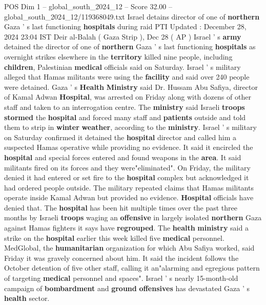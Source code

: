 \begin{textsample}{POS Dim 1 – global\_south\_2024\_12 – Score 32.00 – global\_south\_2024\_12/119368049.txt}  \label{ex:f1_pos_107}
Israel detains director of one of \textbf{northern} Gaza ' s last functioning \textbf{hospitals} during raid PTI Updated : December 28, 2024 23:04 IST Deir al-Balah ( Gaza Strip ), Dec 28 ( AP ) Israel ' s \textbf{army} detained the director of one of \textbf{northern} Gaza ' s last functioning \textbf{hospitals} as overnight strikes elsewhere in the \textbf{territory} killed nine people, including \textbf{children}, Palestinian \textbf{medical} officials said on Saturday.
Israel ' s military alleged that Hamas militants were using the \textbf{facility} and said over 240 people were detained.
Gaza ' s \textbf{Health} \textbf{Ministry} said Dr.
Hussam Abu Safiya, director of Kamal Adwan \textbf{Hospital}, was arrested on Friday along with dozens of other staff and taken to an interrogation centre.
The \textbf{ministry} said Israeli \textbf{troops} \textbf{stormed} the \textbf{hospital} and forced many staff and \textbf{patients} outside and told them to strip in \textbf{winter} \textbf{weather}, according to the \textbf{ministry}.
Israel ' s military on Saturday confirmed it detained the \textbf{hospital} director and called him a suspected Hamas operative while providing no evidence.
It said it encircled the \textbf{hospital} and special forces entered and found weapons in the \textbf{area}.
It said militants fired on its forces and they were"eliminated".
On Friday, the military denied it had entered or set fire to the \textbf{hospital} complex but acknowledged it had ordered people outside.
The military repeated claims that Hamas militants operate inside Kamal Adwan but provided no evidence. \textbf{Hospital} officials have denied that.
The \textbf{hospital} has been hit multiple times over the past three months by Israeli \textbf{troops} waging an \textbf{offensive} in largely isolated \textbf{northern} Gaza against Hamas fighters it says have \textbf{regrouped}.
The \textbf{health} \textbf{ministry} said a strike on the \textbf{hospital} earlier this week killed five \textbf{medical} personnel.
MedGlobal, the \textbf{humanitarian} organization for which Abu Safiya worked, said Friday it was gravely concerned about him.
It said the incident follows the October detention of five other staff, calling it an"alarming and egregious pattern of targeting \textbf{medical} personnel and spaces".
Israel ' s nearly 15-month-old campaign of \textbf{bombardment} and \textbf{ground} \textbf{offensives} has devastated Gaza ' s \textbf{health} sector.

\end{textsample}
